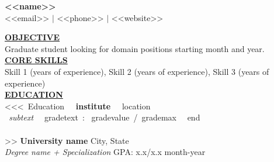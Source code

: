 \documentclass{article}
\begin{document}
\begin{center}
\thispagestyle{empty}
\large \textbf{ <<name>> \\}
\normalsize <<email>> $\mid$ <<phone>> $\mid$ <<website>>    \\
\hrulefill
\end{center}


\noindent \textbf{\underline{OBJECTIVE}} \\
\noindent Graduate student looking for domain positions starting month and year. \\


\noindent \textbf{\underline{CORE SKILLS}} \\
Skill 1 (years of experience), Skill 2 (years of experience), Skill 3 (years of experience) \\

\noindent \textbf{\underline{EDUCATION}} \\
<<<~Education~ \textbf{~institute~} \hfill ~location~ \\
\textit{~subtext~} \hfill ~gradetext~: ~gradevalue~/~grademax~ \hfill ~end~ \\ \\>>
\textbf{University name} \hfill City, State \\
\textit{Degree name + Specialization} \hfill GPA: x.x/x.x \hfill month-year \\
\end{document}
